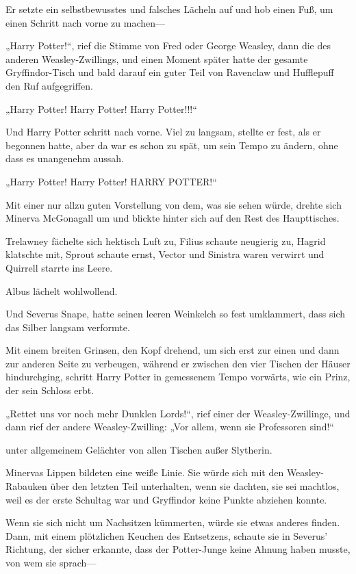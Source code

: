 {Er setzte ein selbstbewusstes und falsches Lächeln auf und hob einen Fuß, um einen Schritt nach vorne zu machen—

„Harry Potter!“, rief die Stimme von Fred oder George Weasley, dann die des anderen Weasley-Zwillings, und einen Moment später hatte der gesamte Gryffindor-Tisch und bald darauf ein guter Teil von Ravenclaw und Hufflepuff den Ruf aufgegriffen.

„Harry Potter! Harry Potter! Harry Potter!!!“

Und Harry Potter schritt nach vorne. Viel zu langsam, stellte er fest, als er begonnen hatte, aber da war es schon zu spät, um sein Tempo zu ändern, ohne dass es unangenehm aussah.

„Harry Potter! Harry Potter! HARRY POTTER!“

Mit einer nur allzu guten Vorstellung von dem, was sie sehen würde, drehte sich Minerva McGonagall um und blickte hinter sich auf den Rest des Haupttisches.

Trelawney fächelte sich hektisch Luft zu, Filius schaute neugierig zu, Hagrid klatschte mit, Sprout schaute ernst, Vector und Sinistra waren verwirrt und Quirrell starrte ins Leere.

Albus lächelt wohlwollend.

Und Severus Snape, hatte seinen leeren Weinkelch so fest umklammert, dass sich das Silber langsam verformte.

Mit einem breiten Grinsen, den Kopf drehend, um sich erst zur einen und dann zur anderen Seite zu verbeugen, während er zwischen den vier Tischen der Häuser hindurchging, schritt Harry Potter in gemessenem Tempo vorwärts, wie ein Prinz, der sein Schloss erbt.

„Rettet uns vor noch mehr Dunklen Lords!“, rief einer der Weasley-Zwillinge, und dann rief der andere Weasley-Zwilling: „Vor allem, wenn sie Professoren sind!“

unter allgemeinem Gelächter von allen Tischen außer Slytherin.

Minervas Lippen bildeten eine weiße Linie. Sie würde sich mit den Weasley-Rabauken über den letzten Teil unterhalten, wenn sie dachten, sie sei machtlos, weil es der erste Schultag war und Gryffindor keine Punkte abziehen konnte.

Wenn sie sich nicht um Nachsitzen kümmerten, würde sie etwas anderes finden. Dann, mit einem plötzlichen Keuchen des Entsetzens, schaute sie in Severus' Richtung, der sicher erkannte, dass der Potter-Junge keine Ahnung haben musste, von wem sie sprach—

}
